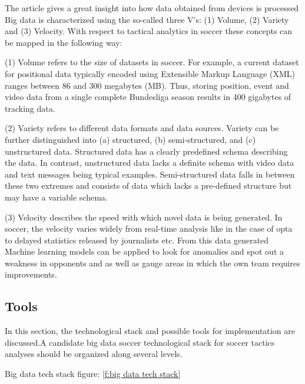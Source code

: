 \documentclass[sigconf]{acmart}
\begin{document}
The article \cite{Rein2016} gives a great insight into how data obtained from devices is processed Big data is characterized using the so-called three V’s: (1) Volume, (2) Variety and (3) Velocity. With respect to tactical analytics in soccer these concepts can be mapped in the following way:

(1) Volume refers to the size of datasets in soccer. For example, a current dataset for positional data typically encoded using Extensible Markup Language (XML) ranges between 86 and 300 megabytes (MB). Thus, storing position, event and video data from a single complete Bundesliga season results in 400 gigabytes of tracking data\cite{Rein2016}.

(2) Variety refers to different data formats and data sources. Variety can be further distinguished into (a) structured, (b) semi-structured, and (c) unstructured data. Structured data has a clearly predefined schema describing the data. In contrast, unstructured data lacks a definite schema with video data and text messages being typical examples. Semi-structured data falls in between these two extremes and consists of data which lacks a pre-defined structure but may have a variable schema\cite{Rein2016}. 

(3) Velocity describes the speed with which novel data is being generated. In soccer, the velocity varies widely from real-time analysis like in the case of opta to delayed statistics released by journalists etc\cite{Rein2016}.
From this data generated Machine learning models can be applied to look for anomalies and spot out a weakness in opponents and as well as gauge areas in which the own team requires improvements.


\subsection{Tools}

In this section, the technological stack and possible tools for implementation are discussed.A candidate big data soccer technological stack for soccer tactics analyses should be organized along several levels.

Big data tech stack figure: \ref{f:big data tech stack}
\end{document}
